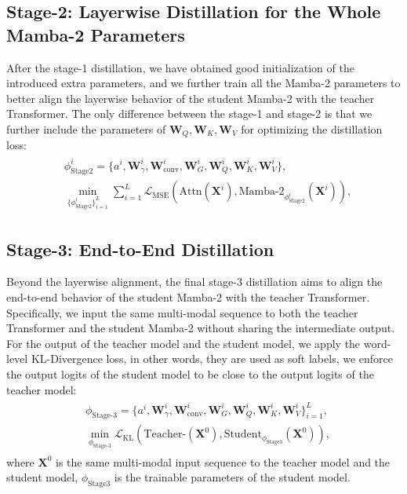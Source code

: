 \subsection{Stage-2: Layerwise Distillation for the Whole Mamba-2 Parameters}
\label{sec:stage2}
After the stage-1 distillation, we have obtained good initialization of the introduced extra parameters, and we further train all the Mamba-2 parameters to better align the layerwise behavior of the student Mamba-2 with the teacher Transformer.
The only difference between the stage-1 and stage-2 is that we further include the parameters of $\boldsymbol{W}_Q, \boldsymbol{W}_K, \boldsymbol{W}_V$ for optimizing the distillation loss:
\begin{align}
    \begin{split}
    &\phi_{\text{Stage2}}^i = \{a^i, \boldsymbol{W}_{\gamma}^i, \boldsymbol{W}_{\text{conv}}^i, \boldsymbol{W}_{G}^i, \boldsymbol{W}_Q^i, \boldsymbol{W}_K^i, \boldsymbol{W}_V^i\}, \\
    &\min_{\{\phi_{\text{Stage2}}^i\}_{i=1}^{L}} \sum_{i=1}^{L}\mathcal{L}_{\mathrm{MSE}}(\text{Attn}(\mathbf{X}^{i}), \text{Mamba-2}_{\phi_{\text{Stage2}}^i}(\mathbf{X}^{i})),
\end{split}
\end{align}


\subsection{Stage-3: End-to-End Distillation}
\label{sec:stage3}
Beyond the layerwise alignment, the final stage-3 distillation aims to align the end-to-end behavior of the student Mamba-2 with the teacher Transformer.
Specifically, we input the same multi-modal sequence to both the teacher Transformer and the student Mamba-2 without sharing the intermediate output.
For the output of the teacher model and the student model, we apply the word-level KL-Divergence loss, in other words, they are used as soft labels, we enforce the output logits of the student model to be close to the output logits of the teacher model:
\begin{align}
\begin{split}
    &\phi_{\text{Stage-3}} = \{a^i, \boldsymbol{W}_{\gamma}^i, \boldsymbol{W}_{\text{conv}}^i, \boldsymbol{W}_{G}^i, \boldsymbol{W}_Q^i, \boldsymbol{W}_K^i, \boldsymbol{W}_V^i\}_{i=1}^{L}, \\
    &\min_{\phi_{\text{Stage-3}}} \mathcal{L}_{\mathrm{KL}}(\text{Teacher-}(\mathbf{X}^0), \text{Student}_{\phi_{\text{Stage3}}}(\mathbf{X}^{0})),
\end{split}
\end{align}
where $\mathbf{X}^0$ is the same multi-modal input sequence to the teacher model and the student model, $\phi_{\text{Stage3}}$ is the trainable parameters of the student model.
                                                                     


